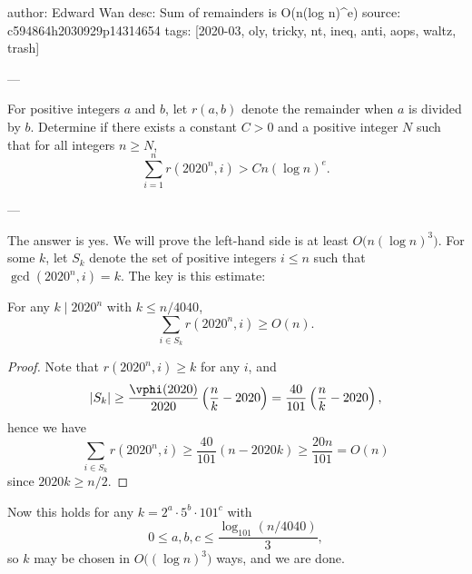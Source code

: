 author: Edward Wan
desc: Sum of remainders is O(n(log n)^e)
source: c594864h2030929p14314654
tags: [2020-03, oly, tricky, nt, ineq, anti, aops, waltz, trash]

---

For positive integers $a$ and $b$, let $r(a,b)$ denote the remainder when $a$ is divided by $b$. Determine if there exists a constant $C>0$ and a positive integer $N$ such that for all integers $n\ge N$, \[\sum_{i=1}^nr(2020^n,i)>Cn(\log n)^e.\]

---

The answer is yes. We will prove the left-hand side is at least $O\big(n(\log n)^3\big)$. For some $k$, let $S_k$ denote the set of positive integers $i\le n$ such that $\gcd(2020^n,i)=k$. The key is this estimate:
\begin{claim*}
    For any $k\mid2020^n$ with $k\le n/4040$, \[\sum_{i\in S_k}r(2020^n,i)\ge O(n).\]
\end{claim*}
\begin{proof}
    Note that $r(2020^n,i)\ge k$ for any $i$, and \[|S_k|\ge\frac{\vphi(2020)}{2020}\left(\frac nk-2020\right)=\frac{40}{101}\left(\frac nk-2020\right),\]
    hence we have \[\sum_{i\in S_k}r(2020^n,i)\ge\frac{40}{101}(n-2020k)\ge\frac{20n}{101}=O(n)\]
    since $2020k\ge n/2$.
\end{proof}

Now this holds for any $k=2^a\cdot5^b\cdot101^c$ with \[0\le a,b,c\le\frac{\log_{101}(n/4040)}3,\]
so $k$ may be chosen in $O\big( (\log n)^3\big)$ ways, and we are done.

